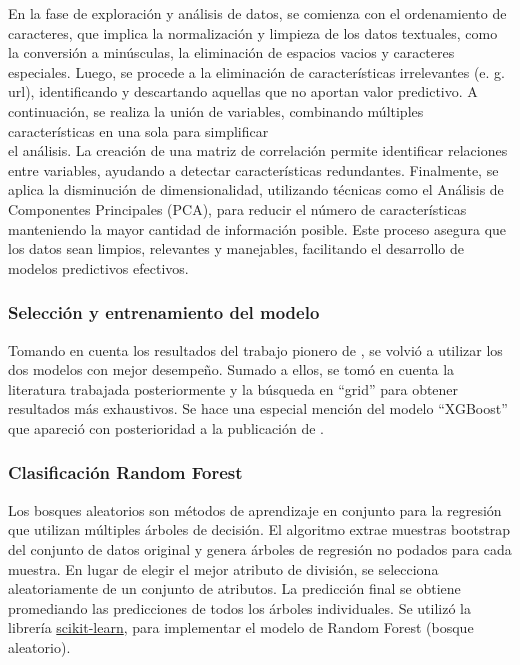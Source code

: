 \documentclass[
  number,
  preprint,
  3p,
  twocolumn]{elsarticle}
\begin{document}
En la fase de exploración y análisis de datos, se comienza con el
ordenamiento de caracteres, que implica la normalización y limpieza de
los datos textuales, como la conversión a minúsculas, la eliminación de
espacios vacios y caracteres especiales. Luego, se procede a la
eliminación de características irrelevantes (e. g. url), identificando y
descartando aquellas que no aportan valor predictivo. A continuación, se
realiza la unión de variables, combinando múltiples características en
una sola para simplificar\\
el análisis. La creación de una matriz de correlación permite
identificar relaciones entre variables, ayudando a detectar
características redundantes. Finalmente, se aplica la disminución de
dimensionalidad, utilizando técnicas como el Análisis de Componentes
Principales (PCA), para reducir el número de características manteniendo
la mayor cantidad de información posible. Este proceso asegura que los
datos sean limpios, relevantes y manejables, facilitando el desarrollo
de modelos predictivos efectivos.

\subsubsection{Selección y entrenamiento del
modelo}\label{selecciuxf3n-y-entrenamiento-del-modelo}

Tomando en cuenta los resultados del trabajo pionero de
\citep{fernandes2015}, se volvió a utilizar los dos modelos con mejor
desempeño. Sumado a ellos, se tomó en cuenta la literatura trabajada
posteriormente y la búsqueda en ``grid'' para obtener resultados más
exhaustivos. Se hace una especial mención del modelo ``XGBoost'' que
apareció con posterioridad a la publicación de \citep{fernandes2015}.

\subsubsection{Clasificación Random
Forest}\label{clasificaciuxf3n-random-forest}

Los bosques aleatorios son métodos de aprendizaje en conjunto para la
regresión que utilizan múltiples árboles de decisión. El algoritmo
extrae muestras bootstrap del conjunto de datos original y genera
árboles de regresión no podados para cada muestra. En lugar de elegir el
mejor atributo de división, se selecciona aleatoriamente de un conjunto
de atributos. La predicción final se obtiene promediando las
predicciones de todos los árboles individuales. Se utilizó la librería
\href{https://scikit-learn.org/stable/modules/generated/sklearn.ensemble.RandomForestClassifier.html}{scikit-learn},
para implementar el modelo de Random Forest (bosque aleatorio).
\end{document}
